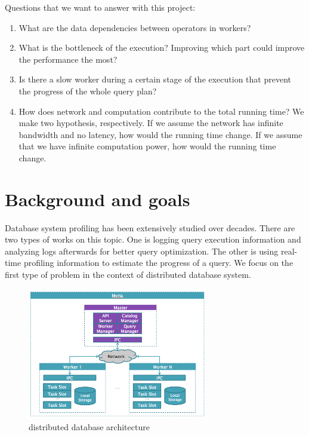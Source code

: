 \documentclass[11pt]{article}
\begin{document}
\noindent Questions that we want to answer with this project:

\begin{enumerate}
	\item What are the data dependencies between operators in workers?
	\item What is the bottleneck of the execution? Improving which part could improve the performance the most?
	\item Is there a slow worker during a certain stage of the execution that prevent the progress of the whole query plan?
	\item How does network and computation contribute to the total running time? We make two hypothesis, respectively. If we assume the network has infinite bandwidth and no latency, how would the running time change. If we assume that we have infinite computation power, how would the running time change.

\end{enumerate}

\section{Background and goals}
\label{sec:background}

Database system profiling has been extensively studied over decades. There are two types of works on this topic. One is logging query execution information and analyzing logs afterwards for better query optimization. The other is using real-time profiling information to estimate the progress of a query. We focus on the first type of problem in the context of distributed database system.

\begin{figure}
 \begin{center}
     \includegraphics[width=0.7\textwidth]{myria.png}
   \end{center}
  \caption{distributed database architecture}
  \label{fig:myria_arc}
\end{figure}
\end{document}
